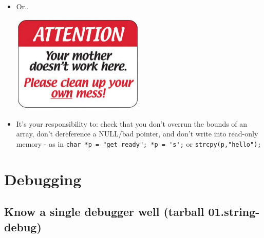 \documentclass[handout]{beamer}
\newcommand{\pitem}{\pause \item}
\begin{document}
\begin{frame}[fragile]

  \begin{itemize}

  \item
  Or..

  \begin{center}
  \includegraphics[width=0.5\textwidth]{img/cleanYourMess.jpeg}
  \end{center}

  \pitem
  \alert{It's your responsibility} to: check that you don't overrun the
  bounds of an array,
  \pause
  don't dereference a NULL/bad pointer,
  \pause
  and don't write into read-only memory - as in
  \verb+char *p = "get ready"; *p = 's';+ or \verb+strcpy(p,"hello");+

  \end{itemize}
\end{frame}

\section{Debugging}
\subsection{Know a single debugger well (tarball 01.string-debug)}
\end{document}
